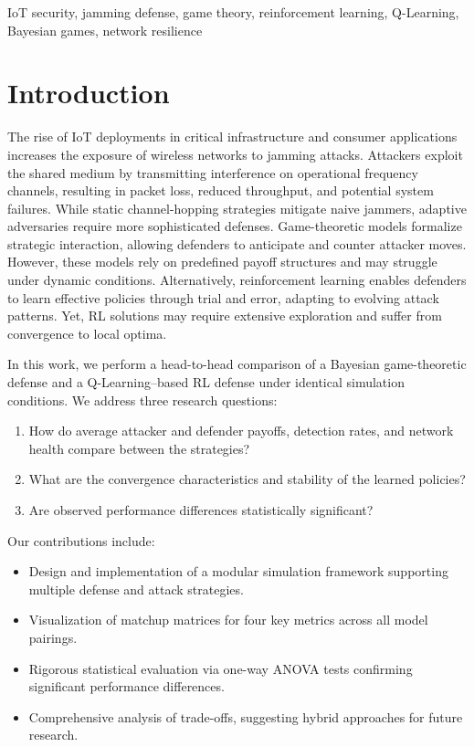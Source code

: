 \documentclass[conference]{IEEEtran}
\begin{document}
\begin{IEEEkeywords}
IoT security, jamming defense, game theory, reinforcement learning, Q-Learning, Bayesian games, network resilience
\end{IEEEkeywords}

\section{Introduction}
The rise of IoT deployments in critical infrastructure and consumer applications increases the exposure of wireless networks to jamming attacks. Attackers exploit the shared medium by transmitting interference on operational frequency channels, resulting in packet loss, reduced throughput, and potential system failures. While static channel-hopping strategies mitigate naive jammers, adaptive adversaries require more sophisticated defenses. Game-theoretic models formalize strategic interaction, allowing defenders to anticipate and counter attacker moves. However, these models rely on predefined payoff structures and may struggle under dynamic conditions. Alternatively, reinforcement learning enables defenders to learn effective policies through trial and error, adapting to evolving attack patterns. Yet, RL solutions may require extensive exploration and suffer from convergence to local optima.

In this work, we perform a head-to-head comparison of a Bayesian game-theoretic defense and a Q-Learning–based RL defense under identical simulation conditions. We address three research questions:
\begin{enumerate}
  \item How do average attacker and defender payoffs, detection rates, and network health compare between the strategies?  
  \item What are the convergence characteristics and stability of the learned policies?  
  \item Are observed performance differences statistically significant?  
\end{enumerate}

Our contributions include:
\begin{itemize}
  \item Design and implementation of a modular simulation framework supporting multiple defense and attack strategies.  
  \item Visualization of matchup matrices for four key metrics across all model pairings.  
  \item Rigorous statistical evaluation via one-way ANOVA tests confirming significant performance differences.  
  \item Comprehensive analysis of trade-offs, suggesting hybrid approaches for future research.  
\end{itemize}
\end{document}
